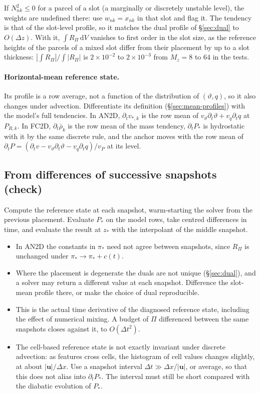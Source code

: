 \documentclass[11pt,a4paper]{article}
\newcommand{\vt}{\vartheta}
\newcommand{\zs}{z_{*}}
\begin{document}
If $N^2_{nk}\le0$ for a parcel of a slot (a marginally or discretely unstable level), the weights are undefined there: use
$w_{nk}=x_{nk}$ in that slot and flag it. The tendency is that of the slot-level profile, so it matches the dual profile of
\S\ref{sec:dual} to $O(\Delta z)$. With it, $\int R_\Pi\,\mathrm dV$ vanishes to first order in the slot size, as the reference
heights of the parcels of a mixed slot differ from their placement by up to a slot thickness: $|\int R_\Pi|/\int|R_\Pi|$ is
$2\times10^{-2}$ to $2\times10^{-3}$ from $M_z=8$ to $64$ in the tests.

\paragraph{Horizontal-mean reference state.} Its profile is a row average, not a function of the distribution of $(\vt,q)$,
so it also changes under advection. Differentiate its definition (\S\ref{sec:mean-profiles}) with the model's full
tendencies. In AN2D, $\partial_tv_{*,k}$ is the row mean of $v_\vt\partial_t\vt+v_q\partial_tq$ at $P_{R,k}$. In FC2D,
$\partial_t\bar\rho_k$ is the row mean of the mass tendency, $\partial_tP_*$ is hydrostatic with it by the same discrete rule,
and the anchor moves with the row mean of $\partial_tP=(\partial_tv-v_\vt\partial_t\vt-v_q\partial_tq)/v_P$ at its level.

\subsection{From differences of successive snapshots (check)}\label{sec:dtpstar-a}
Compute the reference state at each snapshot, warm-starting the solver from the previous placement. Evaluate $P_*$ on the model
rows, take centred differences in time, and evaluate the result at $\zs$ with the interpolant of the middle snapshot.
\begin{itemize}
  \item In AN2D the constants in $\pi_*$ need not agree between snapshots, since $R_\Pi$ is unchanged under
        $\pi_*\to\pi_*+c(t)$.
  \item Where the placement is degenerate the duals are not unique (\S\ref{sec:dual}), and a solver may return a different value at
        each snapshot. Difference the slot-mean profile there, or make the choice of dual reproducible.
  \item This is the actual time derivative of the diagnosed reference state, including the effect of numerical mixing. A
        budget of $\Pi$ differenced between the same snapshots closes against it, to $O(\Delta t^2)$.
  \item The cell-based reference state is not exactly invariant under discrete advection: as features cross cells, the
        histogram of cell values changes slightly, at about $|\mathbf u|/\Delta x$. Use a snapshot interval
        $\Delta t\gg\Delta x/|\mathbf u|$, or average, so that this does not alias into $\partial_tP_*$. The interval must
        still be short compared with the diabatic evolution of $P_*$.
\end{itemize}
\end{document}
